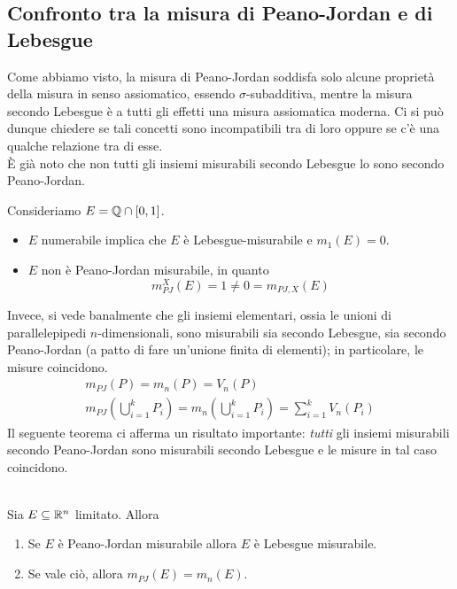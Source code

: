 \subsection{Confronto tra la misura di Peano-Jordan e di Lebesgue}
Come abbiamo visto, la misura di Peano-Jordan soddisfa solo alcune proprietà della misura in senso assiomatico, essendo $\sigma$-subadditiva, mentre la misura secondo Lebesgue è a tutti gli effetti una misura assiomatica moderna. Ci si può dunque chiedere se tali concetti sono incompatibili tra di loro oppure se c'è una qualche relazione tra di esse.\\
È già noto che non tutti gli insiemi misurabili secondo Lebesgue lo sono secondo Peano-Jordan.
\begin{example}
	Consideriamo $E=\mathbb{Q}\cap\left[0,1\right]$.
	\begin{itemize}
		\item $E$ numerabile implica che $E$ è Lebesgue-misurabile e $m_1\left(E\right)=0$.
		\item $E$ non è Peano-Jordan misurabile, in quanto
		\begin{equation*}
			m_{PJ}^{X}\left(E\right)=1\neq 0=m_{PJ,X}\left(E\right)
		\end{equation*}
	\end{itemize}
\end{example}
Invece, si vede banalmente che gli insiemi elementari, ossia le unioni di parallelepipedi $n$-dimensionali, sono misurabili sia secondo Lebesgue, sia secondo Peano-Jordan (a patto di fare un'unione finita di elementi); in particolare, le misure coincidono.
\begin{gather*}
	m_{PJ}\left(P\right)=m_n\left(P\right)=V_n\left(P\right)\\
	m_{PJ}\left(\bigcup_{i=1}^{k}P_i\right)=m_n\left(\bigcup_{i=1}^{k}P_i\right)=\sum_{i=1}^{k}V_n\left(P_i\right)
\end{gather*}
Il seguente teorema ci afferma un risultato importante: \textit{tutti} gli insiemi misurabili secondo Peano-Jordan sono misurabili secondo Lebesgue e le misure in tal caso coincidono.
\begin{theorema}~{}\\
	Sia $E\subseteq\mathbb{R}^n$ limitato. Allora
	\begin{enumerate}
		\item Se $E$ è Peano-Jordan misurabile allora $E$ è Lebesgue misurabile.
		\item Se vale ciò, allora $m_{PJ}\left(E\right)=m_n\left(E\right)$.
	\end{enumerate}
\end{theorema}
